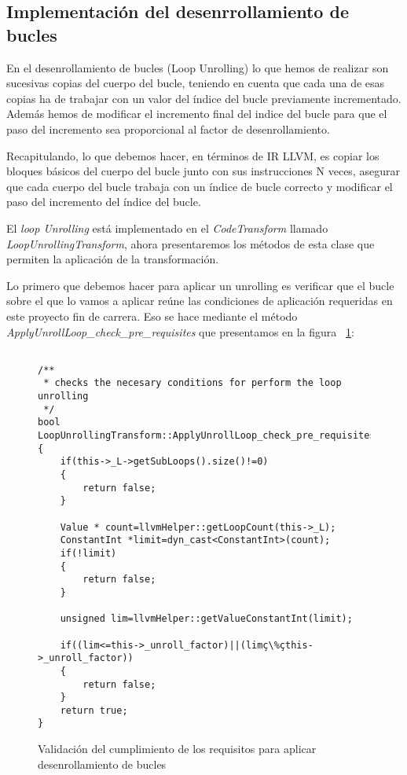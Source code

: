 \subsection{Implementación del desenrrollamiento de bucles}

En el desenrollamiento de bucles (Loop Unrolling) lo que hemos de realizar son sucesivas copias del cuerpo del bucle, teniendo en cuenta que cada una de esas copias ha de trabajar con un valor del índice del bucle previamente incrementado. Además hemos de modificar el incremento final del indice del bucle para que el paso del incremento sea proporcional al factor de desenrollamiento.

Recapitulando, lo que debemos hacer, en términos de IR LLVM, es copiar los bloques básicos del cuerpo del bucle junto con sus instrucciones N veces, asegurar que cada cuerpo del bucle trabaja con un índice de bucle correcto y modificar el paso del incremento del índice del bucle.

El \textit{loop Unrolling} está implementado en el \textit{CodeTransform} llamado \textit{LoopUnrollingTransform}, ahora presentaremos los métodos de esta clase que permiten la aplicación de la transformación.

Lo primero que debemos hacer para aplicar un unrolling es verificar que el bucle sobre el que lo vamos a aplicar reúne las condiciones de aplicación requeridas en este proyecto fin de carrera. Eso se hace mediante el método \textit{ApplyUnrollLoop\_check\_pre\_requisites} que presentamos en la figura ~\ref{FIG:LoopUnrollRequisites}:


\begin{figure}[t]
\begin{lstlisting}

/**
 * checks the necesary conditions for perform the loop unrolling
 */
bool LoopUnrollingTransform::ApplyUnrollLoop_check_pre_requisites()
{
	if(this->_L->getSubLoops().size()!=0)
	{
		return false;
	}

	Value * count=llvmHelper::getLoopCount(this->_L);
	ConstantInt *limit=dyn_cast<ConstantInt>(count);
	if(!limit)
	{
		return false;
	}

	unsigned lim=llvmHelper::getValueConstantInt(limit);

	if((lim<=this->_unroll_factor)||(limç\%çthis->_unroll_factor))
	{
		return false;
	}
	return true;
}

\end{lstlisting}
\caption{Validación del cumplimiento de los requisitos para aplicar desenrollamiento de bucles}
\label{FIG:LoopUnrollRequisites}
\end{figure}

